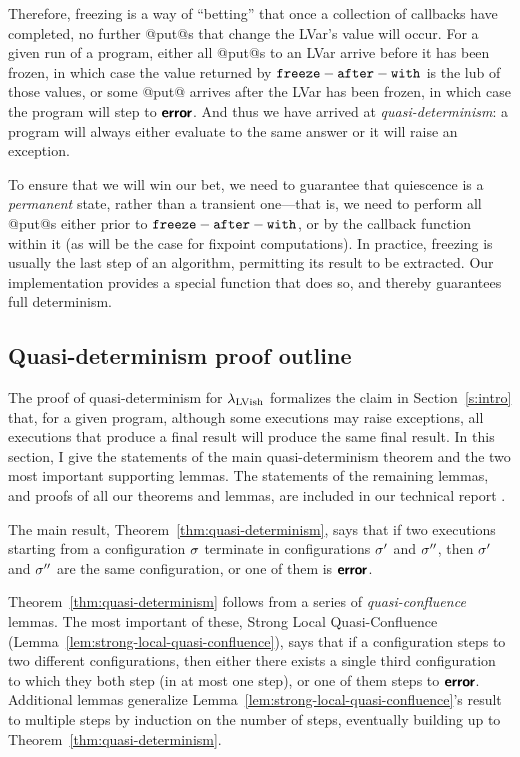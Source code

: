\documentclass{article}
\begin{document}
Therefore, freezing is a way of ``betting'' that once a collection of
callbacks have completed, no further @put@s that change the LVar's
value will occur.  For a given run of a program, either all @put@s to
an LVar arrive before it has been frozen, in which case the value
returned by ${\mbox{\texttt{freeze}}-\mbox{\texttt{after}}-\mbox{\texttt{with}}}$ is the lub of those values, or some @put@ arrives
after the LVar has been frozen, in which case the program will step
to $\textbf{\textsf{error}}$.  And thus we have arrived at \emph{quasi-determinism}: a
program will always either evaluate to the same answer or it will
raise an exception.

To ensure that we will win our bet, we need to guarantee that
quiescence is a \emph{permanent} state, rather than a transient
one---that is, we need to perform all @put@s either prior to ${\mbox{\texttt{freeze}}-\mbox{\texttt{after}}-\mbox{\texttt{with}}}$,
or by the callback function within it (as will be the case for
fixpoint computations).  In practice, freezing is usually the last
step of an algorithm, permitting its result to be extracted. Our
implementation provides a special  function
that does so, and thereby guarantees full determinism.

\subsection{Quasi-determinism proof outline}

The proof of quasi-determinism for $\lambda_{\textrm{LVish}}$ formalizes the claim
in Section~\ref{s:intro} that, for a given program, although some
executions may raise exceptions, all executions that produce a final
result will produce the same final result.  In this section, I give
the statements of the main quasi-determinism theorem and the two most
important supporting lemmas.  The statements of the remaining lemmas,
and proofs of all our theorems and lemmas, are included in our
technical report \cite{Freeze-TR}.

The main result, Theorem~\ref{thm:quasi-determinism}, says that if two
executions starting from a configuration $\sigma$ terminate in
configurations $\sigma'$ and $\sigma''$, then $\sigma'$ and $\sigma''$ are
the same configuration, or one of them is $\textbf{\textsf{error}}$.

\ThmQuasiDeterminism

\noindent Theorem~\ref{thm:quasi-determinism} follows from a series of
\emph{quasi-confluence} lemmas.  The most important of these, Strong
Local Quasi-Confluence
(Lemma~\ref{lem:strong-local-quasi-confluence}), says that if a
configuration steps to two different configurations, then either there
exists a single third configuration to which they both step (in at
most one step), or one of them steps to $\textbf{\textsf{error}}$.  Additional lemmas
generalize Lemma~\ref{lem:strong-local-quasi-confluence}'s result to
multiple steps by induction on the number of steps, eventually
building up to Theorem~\ref{thm:quasi-determinism}.
\end{document}
